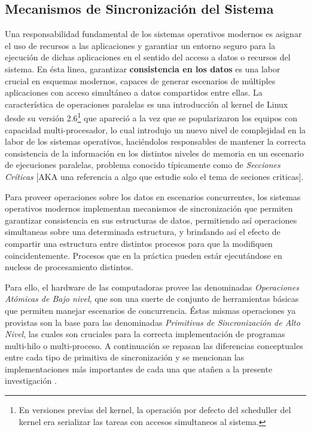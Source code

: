 \subsection{Mecanismos de Sincronización del Sistema}
Una responsabilidad fundamental de los sistemas operativos modernos es asignar el uso de recursos a las aplicaciones y garantiar un entorno seguro para la ejecución de dichas aplicaciones en el sentido del acceso a datos o recursos del sistema. En ésta linea, garantizar \textbf{consistencia en los datos} es una labor crucial en esquemas modernos, capaces de generar escenarios de múltiples aplicaciones con acceso simultáneo a datos compartidos entre ellas. La característica de operaciones paralelas es una introducción al kernel de Linux desde su versión 2.6\footnote{En versiones previas del kernel, la operación por defecto del scheduller del kernel era serializar las tareas con accesos simultaneos al sistema.} que apareció a la vez que se popularizaron los equipos con capacidad multi-procesador, lo cual introdujo un nuevo nivel de complejidad en la labor de los sistemas operativos, haciéndolos responsables de mantener la correcta consistencia de la información en los distintos niveles de memoria en un escenario de ejecuciones paralelas, problema conocido típicamente como de \emph{Secciones Críticas} [AKA una referencia a algo que estudie solo el tema de seciones criticas].

Para proveer operaciones sobre los datos en escenarios concurrentes, los sistemas operativos modernos implementan mecanismos de sincronización que permiten garantizar consistencia en sus estructuras de datos, permitiendo así operaciones simultaneas sobre una determinada estructura, y brindando así el efecto de compartir una estructura entre distintos procesos para que la modifiquen coincidentemente. Procesos que en la práctica pueden estár ejecutándose en nucleos de procesamiento distintos.

Para ello, el hardware de las computadoras provee las denominadas \emph{Operaciones Atómicas de Bajo nivel}, que son una suerte de conjunto de herramientas básicas que permiten manejar escenarios de concurrencia. Éstas mismas operaciones ya provistas son la base para las denominadas \emph{Primitivas de Sincronización de Alto Nivel}, las cuales son cruciales para la correcta implementación de programas multi-hilo o multi-proceso. A continuación se repasan las diferencias conceptuales entre cada tipo de primitiva de sincronización y se mencionan las implementaciones más importantes de cada una que atañen a la presente investigación \cite{book:SOConcepts}.

